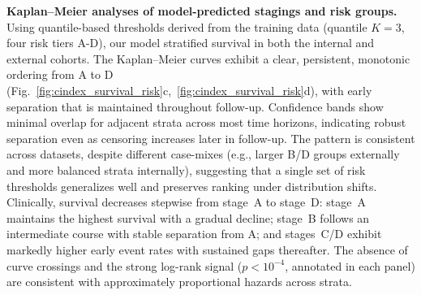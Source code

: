 \documentclass{article}
\begin{document}
\textbf{Kaplan–Meier analyses of model-predicted stagings and risk groups.}
Using quantile-based thresholds derived from the training data (quantile $K{=}3$, four risk tiers A-D), our model stratified survival in both the internal and external cohorts. The Kaplan–Meier curves exhibit a clear, persistent, monotonic ordering from A to D (Fig.~\ref{fig:cindex_survival_risk}c,~\ref{fig:cindex_survival_risk}d), with early separation that is maintained throughout follow-up. Confidence bands show minimal overlap for adjacent strata across most time horizons, indicating robust separation even as censoring increases later in follow-up. The pattern is consistent across datasets, despite different case-mixes (e.g., larger B/D groups externally and more balanced strata internally), suggesting that a single set of risk thresholds generalizes well and preserves ranking under distribution shifts. Clinically, survival decreases stepwise from stage~A to stage~D: stage~A maintains the highest survival with a gradual decline; stage~B follows an intermediate course with stable separation from A; and stages~C/D exhibit markedly higher early event rates with sustained gaps thereafter. The absence of curve crossings and the strong log-rank signal ($p{<}10^{-4}$, annotated in each panel) are consistent with approximately proportional hazards across strata.
 

\end{document}
